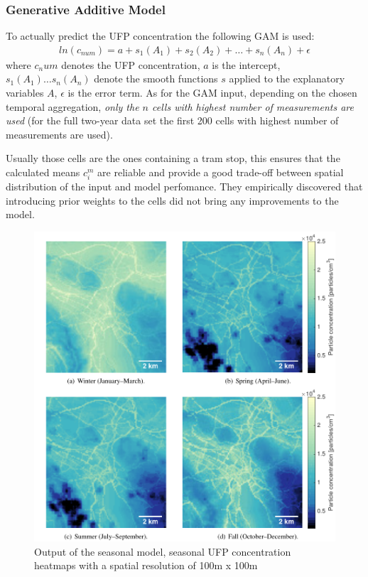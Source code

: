 \documentclass[11pt,a4paper,titlepage]{book}
\begin{document}
\subsubsection{Generative Additive Model}
To actually predict the UFP concentration the following GAM is used:
\begin{align}
    ln(c_{num}) = a + s_1(A_1) + s_2(A_2) + \dots + s_n(A_n) + \epsilon
\end{align}
where $c_num$ denotes the UFP concentration, $a$ is the intercept, $s_1(A_1)\dots s_n(A_n)$ denote the smooth functions $s$ applied to the explanatory variables $A$, $\epsilon$ is the error term.
\newline
\newline
As for the GAM input, depending on the chosen temporal aggregation, \textit{only the $n$ cells with highest number of measurements are used} (for the full two-year data set the first 200 cells with highest number of measurements are used).

Usually those cells are the ones containing a tram stop, this ensures that the calculated means $c_i^m$ are reliable and provide a good trade-off between spatial distribution of the input and model perfomance. They empirically discovered that introducing prior weights to the cells did not bring any improvements to the model.
\begin{figure}[ht]
    \centering
    \includegraphics[width=\textwidth]{imgs/ch_2/OpenSense_heatmap.png}
    \caption{Output of the seasonal model, seasonal UFP concentration heatmaps with a spatial resolution of 100m x 100m} 
    \label{opensense_heatmap}
\end{figure}
\end{document}
